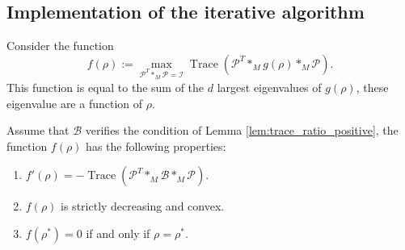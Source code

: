 \documentclass{siamltex}
\begin{document}
\subsection{Implementation of the iterative algorithm}
Consider the function
\begin{equation*}
f(\rho):= \max_{\mathcal{P}^T *_M \mathcal{P}= \mathcal{I}} \operatorname{Trace}\left(\mathcal{P}^T *_M g(\rho) *_M \mathcal{P}\right).
\end{equation*}
This function is equal to the sum of the $d$ largest eigenvalues of $g(\rho)$, these eigenvalue are a function of $\rho$.
\begin{lemma}\label{lem:f_properties}
Assume that $\mathcal{B}$ verifies the condition of Lemma \ref{lem:trace_ratio_positive}, the function $f(\rho)$ has the following properties:
\begin{enumerate}[label=\arabic*.]
\item $f'(\rho)=-\operatorname{Trace}(\mathcal{P}^T *_M \mathcal{B} *_M \mathcal{P})$.
\item $f(\rho)$ is strictly decreasing and convex.
\item $f(\rho^*)=0$ if and only if $\rho=\rho^*$.
\end{enumerate}
\end{lemma}
\end{document}
